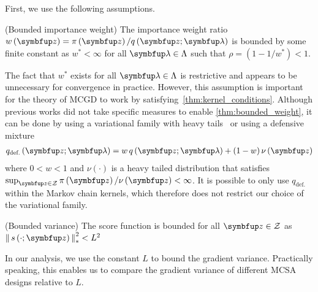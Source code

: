 First, we use the following assumptions.
\begin{assumption}{(Bounded importance weight)}\label{thm:bounded_weight}
  The importance weight ratio \(w\left(\vz\right) = \pi\left(\vz\right) / q\left(\vz; \vlambda\right)\) is bounded by some finite constant as \(w^* < \infty\) for all \(\vlambda \in \Lambda\) such that \(\rho = \left(1 - 1/w^*\right) < 1\).
\end{assumption}
The fact that \(w^*\) exists for all \(\vlambda \in \Lambda\) is restrictive and appears to be unnecessary for convergence in practice.
However, this assumption is important for the theory of MCGD to work by satisfying~\cref{thm:kernel_conditions}.
Although previous works did not take specific measures to enable \cref{thm:bounded_weight}, it can be done by using a variational family with heavy tails~\citep{NEURIPS2018_25db67c5} or using a defensive mixture~\citep{hesterberg_weighted_1995, holden_adaptive_2009} 
\begin{align*}
  q_{\text{def.}}\left(\vz; \vlambda \right) = w \, q\left(\vz; \vlambda\right) + (1 - w) \, \nu\left(\vz\right)
\end{align*}
where \(0 < w < 1\) and \(\nu\left(\cdot\right)\) is a heavy tailed distribution that satisfies \(\sup_{\vz \in \mathcal{Z}} \pi\left(\vz\right) / \nu\left(\vz\right) < \infty\).
It is possible to only use \(q_{\text{def.}}\) within the Markov chain kernels, which therefore does not restrict our choice of the variational family.
%
\begin{assumption}{(Bounded variance)}\label{thm:bounded_score}
  The score function is bounded for all \(\vz \in \mathcal{Z}\) as
  {%
  \(
    \norm{s\left(\cdot; \vz\right)}_{*}^2 < L^2
  \)
  }%
\end{assumption}
In our analysis, we use the constant \(L\) to bound the gradient variance.
Practically speaking, this enables us to compare the gradient variance of different MCSA designs relative to \(L\).

